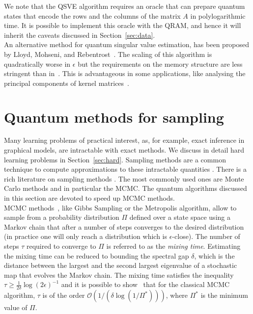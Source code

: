 \documentclass[a4paper, 11pt]{article}
\newcommand{\Ord}[1]{\mathcal{O}(#1)}
\begin{document}
We note that the QSVE algorithm requires an oracle that can prepare quantum states that encode the rows and the columns of the matrix $A$ in polylogarithmic time. It is possible to implement this oracle with the QRAM, and hence it will inherit the caveats discussed in Section~\ref{sec:data}.\\

An alternative method for quantum singular value estimation, has been proposed by Lloyd, Mohseni, and Rebentrost~\cite{lloyd2014pca}. The scaling of this algorithm is quadratically worse in $\epsilon$ but the requirements on the memory structure are less stringent than in~\cite{kerenidis2017quantum}. This is advantageous in some applications, like analysing the principal components of kernel matrices~\cite{rebentrost2014quantum}.\\ 

\section{Quantum methods for sampling}
\label{sec:sampling}

Many learning problems of practical interest, as, for example, exact inference in graphical models, are intractable with exact methods. We discuss in detail hard learning problems in Section~\ref{sec:hard}. Sampling methods are a common technique to compute approximations to these intractable quantities \cite{neal1993probabilistic}. There is a rich literature on sampling methods \cite{neal2001annealed,gilks1992adaptive,propp1996exact,doucet2001introduction,del2006sequential}. The most commonly used ones are Monte Carlo methods and in particular the MCMC. The quantum algorithms discussed in this section are devoted to speed up MCMC methods.\\

MCMC methods~\cite{sinclair1993markov}, like Gibbs Sampling or the Metropolis algorithm, allow to sample from a probability distribution $\Pi$ defined over a state space using a Markov chain that after a number of steps converges to the desired distribution (in practice one will only reach a distribution which is $\epsilon$-close). The number of steps $\tau$ required to converge to $\Pi$ is referred to as the \textit{mixing time}. Estimating the mixing time can be reduced to bounding the spectral gap $\delta$, which is the distance between the largest and the second largest eigenvalue of a stochastic map that evolves the Markov chain. The mixing time satisfies the inequality $\tau \geq \frac{1}{2 \delta} \log{(2 \epsilon)}^{-1}$ and it is possible to show~\cite{sinclair1993markov,wocjan2009quantum} that for the classical MCMC algorithm, $\tau$ is of the order $\Ord{1/(\delta \log{(1/\Pi^*)})}$, where $\Pi^*$ is the minimum value of $\Pi$.\\
\end{document}

